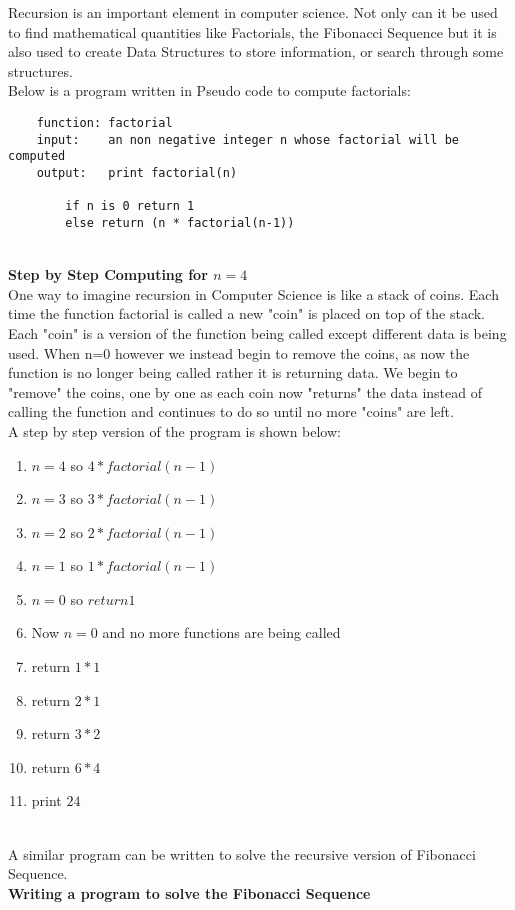 \documentclass{article}
\begin{document}
Recursion is an important element in computer science. Not only can it be used to find mathematical quantities like Factorials, the Fibonacci Sequence but it is also used to create Data Structures to store information, or search through some structures. 
\\Below is a program written in Pseudo code to compute factorials:
\begin{lstlisting}
	function: factorial
	input:    an non negative integer n whose factorial will be computed
	output:   print factorial(n)
	
		if n is 0 return 1
		else return (n * factorial(n-1))
\end{lstlisting}
~\\
{\bf Step by Step Computing for $n=4$}
\\
One way to imagine recursion in Computer Science is like a stack of coins. Each time the function factorial is called a new "coin" is placed on top of the stack. Each "coin" is a version of the function being called except different data is being used.  When n=0 however we instead begin to remove the coins, as now the function is no longer being called rather it is returning data. We begin to "remove" the coins, one by one as each coin now "returns" the data instead of calling the function and continues to do so until no more "coins" are left.
\\
A step by step version of the program is shown below:
\begin{enumerate}
	\item $n=4$ so $4* factorial(n-1)$
	\item $n=3$ so $3* factorial(n-1)$
	\item $n=2$ so $2* factorial(n-1)$
	\item $n=1$ so $1* factorial(n-1)$
	\item $n=0$ so $return 1$
	\item Now $n=0$ and no more functions are being called 
	\item return $1*1$
	\item return $2*1$
	\item return $3*2$
	\item return $6*4$
	\item print $24$
\end{enumerate}
~\\A similar program can be written to solve the recursive version of Fibonacci Sequence.  
\\
{\bf Writing a program to solve the Fibonacci Sequence}
\\
\end{document}
